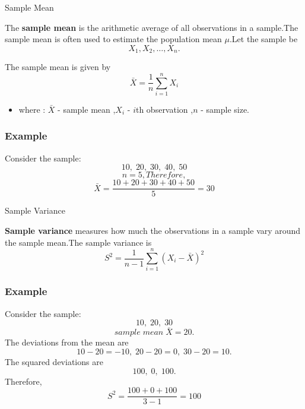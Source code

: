 \documentclass[aspectratio=169]{beamer}
\begin{document}
\begin{frame}{Sample Mean}


The \textbf{sample mean} is the arithmetic average of all observations
in a sample.The sample mean is often used to estimate the population mean $\mu$.Let the sample be
\vspace{0.0 cm}
\[
X_1,X_2,\ldots,X_n.
\]

The sample mean is given by
\vspace{0.0 cm}
\[
\boxed{
\bar{X}=\frac{1}{n}\sum_{i=1}^{n}X_i
}
\]



\begin{itemize}
    \item where : $\bar{X}$ - sample mean ,$X_i$ - $i$th observation ,$n$ - sample size.
\end{itemize}

\subsubsection*{Example}

Consider the sample:\vspace{0cm}
\[
10,\;20,\;30,\;40,\;50
\]
\vspace{0.0cm}
\[
n=5, Therefore,
\]
\vspace{0.0cm}
\[
\bar{X}
=
\frac{10+20+30+40+50}{5}
=30\]


\end{frame}

\begin{frame}{Sample Variance}


\textbf{Sample variance} measures how much the observations in a sample
vary around the sample mean.The sample variance is
\vspace{0.0 cm}
\[
\boxed{
S^2=
\frac{1}{n-1}
\sum_{i=1}^{n}(X_i-\bar{X})^2
}
\]


\subsubsection*{Example}

Consider the sample:
\vspace{0.0 cm}
\[
10,\;20,\;30
\]
\[sample\; mean \;
\bar{X}=20.
\]
\vspace{0.0 cm}
The deviations from the mean are
\vspace{0.0 cm}
\[
10-20=-10,\;
20-20=0,\;
30-20=10.
\]
\vspace{0.0 cm}
The squared deviations are
\vspace{0.0 cm}
\[
100,\;0,\;100.
\]
\vspace{0.0 cm}
Therefore,
\vspace{0.0 cm}
\[
S^2=
\frac{100+0+100}{3-1}=100
\]
\end{frame}
\end{document}
